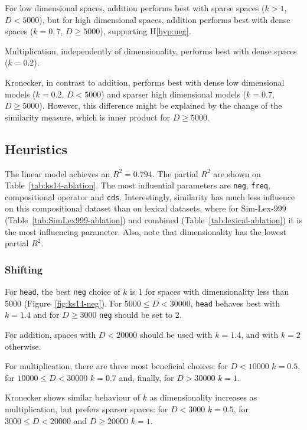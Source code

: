 For low dimensional spaces, addition performs best with sparse spaces ($k > 1$, $D < 5000$), but for high dimensional spaces, addition performs best  with dense spaces ($k = 0,7$, $D \geq 5000$), supporting H\ref{hyp:neg}.

Multiplication, independently of dimensionality, performs best with dense spaces ($k = 0.2$).

Kronecker, in contrast to addition, performs best with dense low dimensional models ($k = 0.2$, $D < 5000$) and sparser high dimensional models ($k = 0.7$, $D \geq 5000$). However, this difference might be explained by the change of the similarity measure, which is inner product for $D \geq 5000$.

\subsection{Heuristics}
\label{sec:heuristics}



The linear model achieves an $R^2 = 0.794$. The partial $R^2$ are shown on Table~\ref{tab:ks14-ablation}. The most influential parameters are \texttt{neg}, \texttt{freq}, compositional operator and \texttt{cds}. Interestingly, similarity has much less influence on this compositional dataset than on lexical datasets, where for Sim-Lex-999 (Table~\ref{tab:SimLex999-ablation}) and combined (Table~\ref{tab:lexical-ablation}) it is the most influencing parameter. Also, note that dimensionality has the lowest partial $R^2$.

\subsubsection{Shifting}


For \texttt{head}, the best \texttt{neg} choice of $k$ is 1 for spaces with dimensionality less than 5000 (Figure~\ref{fig:ks14-neg}). For $5000 \leq D < 30000$, \texttt{head} behaves best with $k = 1.4$ and for $D \geq 3000$ \texttt{neg} should be set to 2.

For addition, spaces with $D < 20000$ should be used with $k = 1.4$, and with $k = 2$ otherwise.

For multiplication, there are three most beneficial choices: for $D < 10000$ $k = 0.5$, for $10000 \leq D < 30000$ $k = 0.7$ and, finally, for $D > 30000$ $k = 1$.

Kronecker shows similar behaviour of $k$ as dimensionality increases as multiplication, but prefers sparser spaces: for $D < 3000$ $k = 0.5$, for $3000 \leq D < 20000$ and $D \geq 20000$ $k = 1$.

